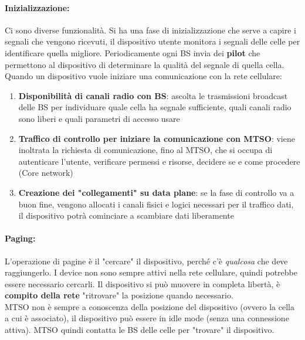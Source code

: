 \paragraph{Inizializzazione:} Ci sono diverse funzionalità. Si ha una fase di inizializzazione che serve a capire i segnali che vengono ricevuti, il dispositivo utente monitora i segnali delle celle per identificare quella migliore. Periodicamente ogni BS invia dei \textbf{pilot} che permettono al dispositivo di determinare la qualità del segnale di quella cella.\\

Quando un dispositivo vuole iniziare una comunicazione con la rete cellulare:
\begin{enumerate}
	\item \textbf{Disponibilità di canali radio con BS}: ascolta le trasmissioni broadcast delle BS per individuare quale cella ha segnale sufficiente, quali canali radio sono liberi e quali parametri di accesso usare
	\item \textbf{Traffico di controllo per iniziare la comunicazione con MTSO}: viene inoltrata la richiesta di comunicazione, fino al MTSO, che si occupa di autenticare l'utente, verificare permessi e risorse, decidere se e come procedere (Core network)
	\item \textbf{Creazione dei "collegamenti" su data plane}: se la fase di controllo va a buon fine, vengono allocati i canali fisici e logici necessari per il traffico dati, il dispositivo potrà cominciare a scambiare dati liberamente
\end{enumerate}

\paragraph{Paging:} L'operazione di pagine è il "cercare" il dispositivo, perché c'è \textit{qualcosa} che deve raggiungerlo. I device non sono sempre attivi nella rete cellulare, quindi potrebbe essere necessario cercarli. Il dispositivo si può muovere in completa libertà, è \textbf{compito della rete} "ritrovare" la posizione quando necessario.\\

MTSO non è sempre a conoscenza della posizione del dispositivo (ovvero la cella a cui è associato), il dispositivo può essere in idle mode (senza una connessione attiva). MTSO quindi contatta le BS delle celle per "trovare" il dispositivo.\\

\newpage

